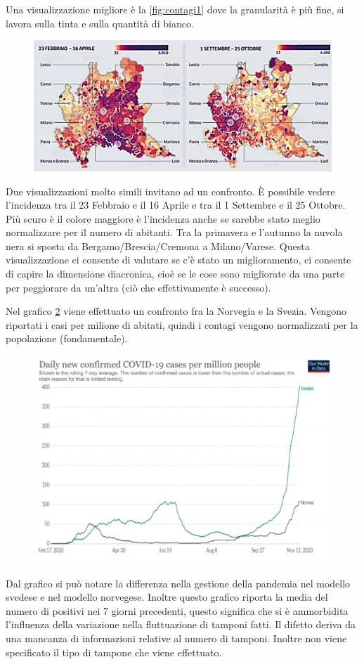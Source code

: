 \documentclass[12pt,a4paper]{report}
\begin{document}
Una visualizzazione migliore è la \ref{fig:contagi1} dove la granularità è più fine, si lavora sulla tinta e sulla quantità di bianco. 

\begin{figure}[h]
	\centering
	\includegraphics[width=0.6\linewidth]{imgs datavis/Grafico covid Lombardia.png}
	\caption{}
	\label{fig:contagi2}
\end{figure} 

Due visualizzazioni molto simili invitano ad un confronto. \`E possibile vedere l'incidenza tra il 23 Febbraio e il 16 Aprile e tra il 1 Settembre e il 25 Ottobre. Più scuro è il colore maggiore è l'incidenza anche se sarebbe stato meglio normalizzare per il numero di abitanti. Tra la primavera e l'autunno la nuvola nera si sposta da Bergamo/Brescia/Cremona a Milano/Varese. Questa visualizzazione ci consente di valutare se c'è stato un miglioramento, ci consente di capire la dimensione diacronica, cioè se le cose sono migliorate da una parte per peggiorare da un'altra (ciò che effettivamente è successo). 

Nel grafico \ref{fig:contagi3} viene effettuato un confronto fra la Norvegia e la Svezia. Vengono riportati i casi per milione di abitati, quindi i contagi vengono normalizzati per la popolazione (fondamentale).
\begin{figure}[h]
	\centering
	\includegraphics[width=0.6\linewidth]{imgs datavis/Covid2.png}
	\caption{}
	\label{fig:contagi3}
\end{figure} 

Dal grafico si può notare la differenza nella gestione della pandemia nel modello svedese e nel modello norvegese. Inoltre questo grafico riporta la media del numero di positivi nei 7 giorni precedenti, questo significa che si è ammorbidita l'influenza della variazione nella fluttuazione di tamponi fatti. Il difetto deriva da una mancanza di informazioni relative al numero di tamponi. Inoltre non viene specificato il tipo di tampone che viene effettuato.
\end{document}
